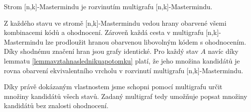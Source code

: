 \begin{veta}
    Strom [n,k]-Mastermindu je rozvinutím multigrafu [n,k]-Mastermindu.
\end{veta}
\begin{dukaz}
    Z každého stavu ve stromě [n,k]-Mastermindu vedou hrany obarvené všemi kombinacemi kódů a ohodnocení. Zároveň každá cesta v multigrafu [n,k]-Mastermindu lze prodloužit hranou obarvenou libovolným kódem s ohodnocením. Díky shodnému značení hran jsou grafy identické. Pro každý stav $A$ navíc díky lemmatu \ref{lemmavztahnaslednikuapotomku} platí, že jeho množina kandidátů je rovna obarvení ekvivalentního vrcholu v rozvinutí multigrafu [n,k]-Mastermindu.
    



\end{dukaz}
Díky právě dokázaným vlastnostem jsme schopni pomocí multigrafu určit množiny kandidátů všech stavů. Zadaný multigraf tedy umožňuje popsat množiny kandidátů bez znalosti ohodnocení. 



